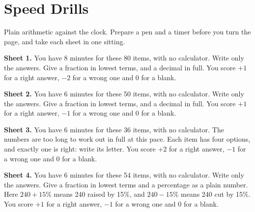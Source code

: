 \chapter{Speed Drills}\label{ch:iv1:speed-drills}

\begin{ivtrains}
Plain arithmetic against the clock. Prepare a pen and a timer before you turn the page, and take each sheet in one sitting.
\end{ivtrains}
\vfill\clearpage

\begin{question}\label{iq:iv1:speed-drills:1}
\textbf{Sheet 1.} You have 8 minutes for these 80 items, with no calculator. Write only the answers. Give a fraction in lowest terms, and a decimal in full. You score $+1$ for a right answer, $-2$ for a wrong one and 0 for a blank.

\end{question}
\clearpage

\begin{question}\label{iq:iv1:speed-drills:2}
\textbf{Sheet 2.} You have 6 minutes for these 50 items, with no calculator. Write only the answers. Give a fraction in lowest terms, and a decimal in full. You score $+1$ for a right answer, $-1$ for a wrong one and 0 for a blank.

\end{question}
\clearpage

\begin{question}\label{iq:iv1:speed-drills:3}
\textbf{Sheet 3.} You have 6 minutes for these 36 items, with no calculator. The numbers are too long to work out in full at this pace. Each item has four options, and exactly one is right: write its letter. You score $+2$ for a right answer, $-1$ for a wrong one and 0 for a blank.

\end{question}
\clearpage

\begin{question}\label{iq:iv1:speed-drills:4}
\textbf{Sheet 4.} You have 6 minutes for these 54 items, with no calculator. Write only the answers. Give a fraction in lowest terms and a percentage as a plain number. Here $240 + 15\%$ means 240 raised by 15\%, and $240 - 15\%$ means 240 cut by 15\%. You score $+1$ for a right answer, $-1$ for a wrong one and 0 for a blank.

\end{question}
\clearpage

